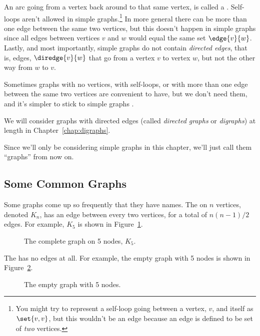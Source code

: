 An arc going from a vertex back around to that same vertex, is called a
.  Self-loops aren't allowed in simple
graphs.\footnote{You might try to represent a self-loop going between a
  vertex, $v$, and itself as $\set{v, v}$, but this wouldn't be an edge
  because an edge is defined to be set of \emph{two} vertices.}  In more
general  there can be more than one edge between the
same two vertices, but this doesn't happen in simple graphs since all
edges between vertices $v$ and $w$ would equal the same set $\edge{v}{w}$.
Lastly, and most importantly, simple graphs do not contain \emph{directed
  edges}, that is, edges, $\diredge{v}{w}$ that go from a vertex $v$ to
vertex $w$, but not the other way from $w$ to $v$.

Sometimes graphs with no vertices, with self-loops, or with more than one
edge between the same two vertices are convenient to have, but we don't
need them, and it's simpler to stick to simple graphs \smiley.
\begin{editingnotes}
We will consider graphs with directed edges (called \emph{directed graphs} or
\emph{digraphs}) at length in Chapter~\ref{chap:digraphs}.
\end{editingnotes}
Since we'll only be considering simple graphs in this chapter, we'll just
call them ``graphs'' from now on.

\subsection{Some Common Graphs}

Some graphs come up so frequently that they have names.  The
 on $n$ vertices, denoted $K_n$, has an edge
between every two vertices, for a total of $n(n-1)/2$ edges.  For
example, $K_5$ is shown in Figure~\ref{fig:K_5}.

\begin{figure}


\caption{The complete graph on 5 nodes, $K_5$.}
\label{fig:K_5}
\end{figure}

The  has no edges at all.  For example, the empty
graph with 5 nodes is shown in Figure~\ref{fig:graph_empty_5}.

\begin{figure}


\caption{The empty graph with 5 nodes.}
\label{fig:graph_empty_5}
\end{figure}

